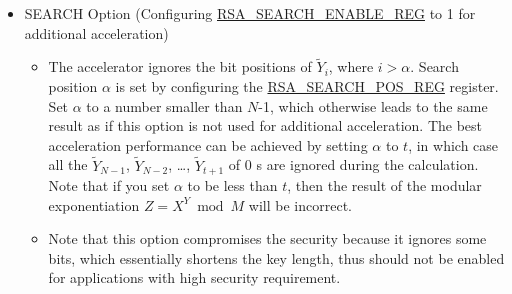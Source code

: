 \documentclass[main\_\_EN.tex]{subfiles}
\begin{document}
\begin{itemize}
 \item SEARCH Option (Configuring \hyperref[regdesc:RSASEARCHENABLEREG]{RSA\_SEARCH\_ENABLE\_REG} to 1 for additional acceleration)
    \begin{itemize}
        \item The accelerator ignores the bit positions of \begin{math} \widetilde{Y}_{i} \end{math}, where \begin{math} i > \alpha \end{math}. Search position \begin{math} \alpha \end{math} is set by configuring the \hyperref[regdesc:RSASEARCHPOSREG]{RSA\_SEARCH\_POS\_REG} register. Set \begin{math} \alpha \end{math} to a number smaller than \begin{math}N\end{math}-1, which otherwise leads to the same result as if this option is not used for additional acceleration. The best acceleration performance can be achieved by setting \begin{math} \alpha \end{math} to \begin{math} t \end{math}, in which case all the \begin{math}\widetilde{Y}_{N-1}\end{math}, \begin{math}\widetilde{Y}_{N-2}\end{math}, \dots, \begin{math}\widetilde{Y}_{t+1}\end{math} of 0 s are ignored during the calculation. Note that if you set \begin{math} \alpha \end{math} to be less than \begin{math} t \end{math}, then the result of the modular exponentiation \begin{math}Z = X^{Y} \bmod M \end{math} will be incorrect.
    \item Note that this option compromises the security because it ignores some bits, which essentially shortens the key length, thus should not be enabled for applications with high security requirement.
    \end{itemize}


\end{itemize}
\end{document}
